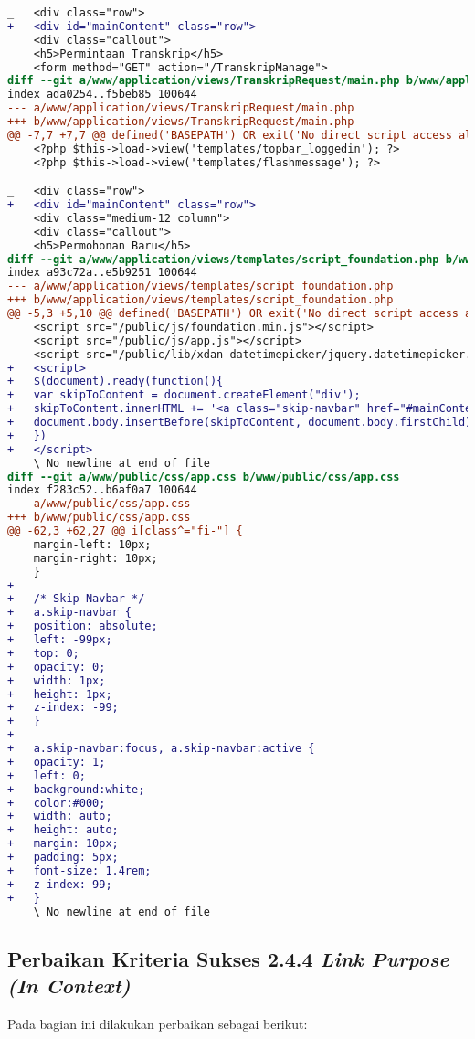 \begin{lstlisting}[frame=single, label={lst:perbaikan_2.4.1_bypass_blocks}, language=diff, caption=Perbaikan Kriteria Sukses 2.4.1]
_   <div class="row">
+   <div id="mainContent" class="row">
    <div class="callout">
    <h5>Permintaan Transkrip</h5>
    <form method="GET" action="/TranskripManage">
diff --git a/www/application/views/TranskripRequest/main.php b/www/application/views/TranskripRequest/main.php
index ada0254..f5beb85 100644
--- a/www/application/views/TranskripRequest/main.php
+++ b/www/application/views/TranskripRequest/main.php
@@ -7,7 +7,7 @@ defined('BASEPATH') OR exit('No direct script access allowed');
    <?php $this->load->view('templates/topbar_loggedin'); ?>
    <?php $this->load->view('templates/flashmessage'); ?>

_   <div class="row">
+   <div id="mainContent" class="row">
    <div class="medium-12 column">
    <div class="callout">
    <h5>Permohonan Baru</h5>
diff --git a/www/application/views/templates/script_foundation.php b/www/application/views/templates/script_foundation.php
index a93c72a..e5b9251 100644
--- a/www/application/views/templates/script_foundation.php
+++ b/www/application/views/templates/script_foundation.php
@@ -5,3 +5,10 @@ defined('BASEPATH') OR exit('No direct script access allowed');
    <script src="/public/js/foundation.min.js"></script>
    <script src="/public/js/app.js"></script>
    <script src="/public/lib/xdan-datetimepicker/jquery.datetimepicker.full.min.js"></script>
+   <script>
+   $(document).ready(function(){
+   var skipToContent = document.createElement("div");
+   skipToContent.innerHTML += '<a class="skip-navbar" href="#mainContent">Lompat ke menu utama</a>';
+   document.body.insertBefore(skipToContent, document.body.firstChild);
+   })
+   </script>
    \ No newline at end of file
diff --git a/www/public/css/app.css b/www/public/css/app.css
index f283c52..b6af0a7 100644
--- a/www/public/css/app.css
+++ b/www/public/css/app.css
@@ -62,3 +62,27 @@ i[class^="fi-"] {
    margin-left: 10px;
    margin-right: 10px;    
    }
+   
+   /* Skip Navbar */
+   a.skip-navbar {
+   position: absolute;
+   left: -99px;
+   top: 0;
+   opacity: 0;
+   width: 1px;
+   height: 1px;
+   z-index: -99;
+   }
+
+   a.skip-navbar:focus, a.skip-navbar:active {
+   opacity: 1;
+   left: 0;
+   background:white;
+   color:#000;
+   width: auto;
+   height: auto;
+   margin: 10px;
+   padding: 5px;
+   font-size: 1.4rem;
+   z-index: 99;
+   }
    \ No newline at end of file
\end{lstlisting}

\subsection{Perbaikan Kriteria Sukses 2.4.4 \textit{Link Purpose (In Context)}}
\label{subsec:perbaikan_kriteria_sukses_2.4.4}
Pada bagian ini dilakukan perbaikan sebagai berikut:

